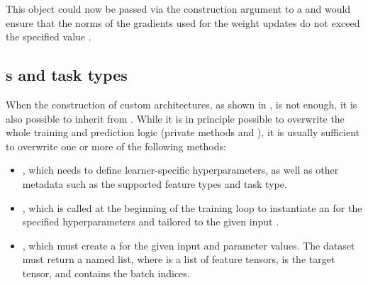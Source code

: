 \documentclass[article]{jss}
\theoremstyle{definition}
\begin{document}

This object could now be passed via the  construction argument to a  and would ensure that the norms of the gradients used for the weight updates do not exceed the specified value .

\subsection[Learners and task types]{s and task types}\label{sec:extending-learner-task}

When the construction of custom architectures, as shown in , is not enough, it is also possible to inherit from .
While it is in principle possible to overwrite the whole training and prediction logic (private methods  and ), it is usually sufficient to overwrite one or more of the following methods:

\begin{itemize}
    \item {}, which needs to define learner-specific hyperparameters, as well as other metadata such as the supported feature types and task type.
    \item {}, which is called at the beginning of the training loop to instantiate an  for the specified hyperparameters and tailored to the given input .
    \item {}, which must create a  for the given input  and parameter values. The dataset must return a named list, where  is a list of feature tensors,  is the target tensor, and  contains the batch indices.
\end{itemize}
\end{document}
